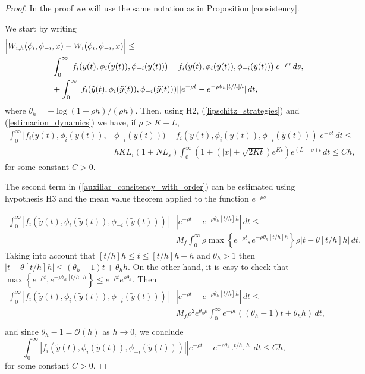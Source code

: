 \documentclass[10pt,a4paper]{amsart}
\begin{document}
\begin{proof}
In the proof we will use the same notation as in Proposition \ref{consistency}.

We start by writing
\begin{align} \label{auxiliar_consitency_with_order}
\Bigl |W_{i,h}({\phi}_i,{\phi}_{-i}&,x)- W_i(\phi_i,\phi_{-i},x)\Bigr |\le\nonumber\\
&\int_0^\infty |f_i(y(t),\phi_i(y(t)),\phi_{-i}(y(t)))-f_i(\tilde{y}(t),{\phi}_i(\tilde{y}(t)),\phi_{-i}(\tilde{y}(t)))|e^{-\rho t}\, ds,\nonumber\\
&+\int_0^\infty|f_i(\tilde{y}(t),{\phi}_i(\tilde{y}(t)),\phi_{-i}(\tilde{y}(t)))||e^{-\rho t}-e^{- \rho\theta_h[t/h]h}|\, dt,
\end{align}
where $\theta_h=-\log(1-\rho h)/(\rho h)$.
Then, using  H2, (\ref{lipschitz_strategies}) and (\ref{estimacion_dynamics}) we have, if {$\rho>K+ L$},
\begin{equation*}
\begin{split}
\int_0^\infty |f_i(y(t),\phi_i(y(t)),&\phi_{-i}(y(t)))-f_i(\tilde{y}(t),{\phi}_i(\tilde{y}(t)),\phi_{-i}(\tilde{y}(t)))|e^{-\rho t}\, dt\le \\
&hKL_i(1+NL_s)\int_0^\infty\left(1+(|x|+\sqrt{2Kt})e^{Kt}\right)e^{(L-\rho)t} \, dt \le C h,
\end{split}
\end{equation*}
for some constant $C>0$.

The second term in (\ref{auxiliar_consitency_with_order}) can be estimated using hypothesis H3 and the mean
 value theorem {applied to the function $e^{-\rho s}$}

\begin{equation*}
\begin{split}
\int_0^\infty|f_i(\tilde{y}(t),{\phi}_i(\tilde{y}(t)),\phi_{-i}(\tilde{y}(t)))|&|e^{-\rho t}-e^{- \rho\theta_h[t/h]h}|\, dt\le\\&{
M_f \int_0^\infty \rho\max\left\{e^{-\rho t},e^{-\rho\theta_h[t/h]h}\right\}\rho| t- \theta[t/h]h| \, dt.}
\end{split}
\end{equation*}
{Taking into account that $[t/h]h\le t\le [t/h]h+h$ and $\theta_h>1$ then $|t- \theta[t/h]h|\le (\theta_h-1)t+\theta_h h$. On the other hand, it is easy to check that $\max\left\{e^{-\rho t},e^{-\rho\theta_h[t/h]h}\right\}
\le e^{-\rho t} e^{\rho \theta_h}.$ Then}
\begin{equation*}
\begin{split}
\int_0^\infty|f_i(\tilde{y}(t),{\phi}_i(\tilde{y}(t)),\phi_{-i}(\tilde{y}(t)))|&|e^{-\rho t}-e^{- \rho\theta_h[t/h]h}|\, dt\le\\
&M_f\rho^2 {e^{\theta_h\rho }}\int_0^{\infty}e^{-\rho t}((\theta_h-1)t+\theta_h h) \, dt,\\
\end{split}
\end{equation*}
and since
 $ \theta_h-1=\mathcal{O}(h)$ as $h\rightarrow 0$, we conclude
\begin{equation*}
\int_0^\infty|f_i(\tilde{y}(t),{\phi}_i(\tilde{y}(t)),\phi_{-i}(\tilde{y}(t)))||e^{-\rho t}-e^{- \rho\theta_h[t/h]h}|\, dt\le Ch,
\end{equation*}
for some constant $C>0.$


\end{proof}
\end{document}
